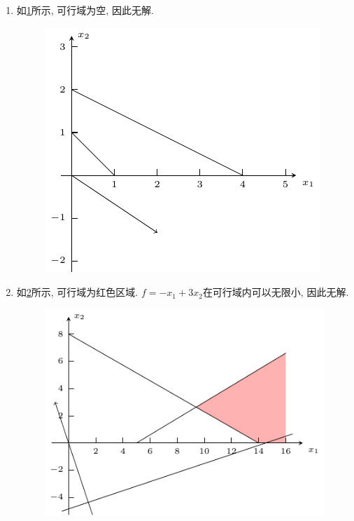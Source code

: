 \begin{enumerate}[label=\alph*)]
    \item
        如\cref{figure:5a}所示, 可行域为空, 因此无解.
        \begin{figure}[ht]
            \centering
            \includegraphics[scale=1.2]{figures/5a.pdf}
            \caption{}
            \label{figure:5a}
        \end{figure}

    \item
        如\cref{figure:5b}所示, 可行域为红色区域.
        $f=-x_1+3x_2$在可行域内可以无限小, 因此无解.
        \begin{figure}[ht]
            \centering
            \includegraphics[scale=1.3]{figures/5b.pdf}
            \caption{}
            \label{figure:5b}
        \end{figure}
\end{enumerate}
